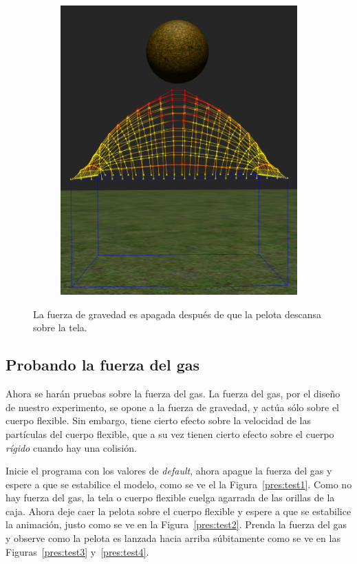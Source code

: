 \begin{figure}
\begin{subfigure}[b]{0.3\textwidth}
  \end{subfigure}
~
  \begin{subfigure}[b]{0.3\textwidth}
    \includegraphics[width=\textwidth]{Img/04/gravityOff3}
  \end{subfigure}
 \caption[Experimento: Apagar la fuerza de gravedad]{La fuerza de gravedad es apagada después de que la pelota descansa sobre la tela.} 
 \label{fig:noGravity}
\end{figure}

\subsection{Probando la fuerza del gas}
Ahora se harán pruebas sobre la fuerza del gas. La fuerza del gas, por el diseño de nuestro experimento, se opone a la fuerza de gravedad, y actúa sólo sobre el cuerpo flexible.
Sin embargo, tiene cierto efecto sobre la velocidad de las partículas del cuerpo flexible, que a su vez tienen cierto efecto sobre el cuerpo \emph{rígido} cuando hay una colisión.

Inicie el programa con los valores de \emph{\textenglish{default}}, ahora apague la fuerza del gas y espere a que se estabilice el modelo, como se ve el la Figura~\ref{pres:test1}.
Como no hay fuerza del gas, la tela o cuerpo flexible cuelga agarrada de las orillas de la caja.
Ahora deje caer la pelota sobre el cuerpo flexible y espere a que se estabilice la animación, justo como se ve en la Figura~\ref{pres:test2}. 
Prenda la fuerza del gas y observe como la pelota es lanzada hacia arriba súbitamente como se ve en las Figuras~\ref{pres:test3} y~\ref{pres:test4}.

